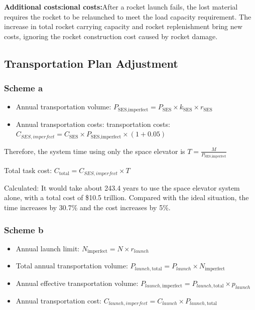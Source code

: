 \textbf{Additional costs:ional costs:}After a rocket launch fails, the lost material requires the rocket to be relaunched to meet the load capacity requirement. The increase in total rocket carrying capacity and rocket replenishment bring new costs, ignoring the rocket construction cost caused by rocket damage.


\subsection{Transportation Plan Adjustment}

\subsubsection{Scheme a}
\begin{itemize}
  \item Annual transportation volume: $P_{\text{SES},\text{imperfect}} = P_{\text{SES}} \times k_{\text{SES}} \times r_{\text{SES}}$

  \item Annual transportation costs: transportation costs: $C_{SES,imperfect} = C_{\text{SES}} \times P_{\text{SES},\text{imperfect}} \times (1 + 0.05)$
\end{itemize}
Therefore, the system time using only the space elevator is \(T = \frac{M}{P_{\text{SES},\text{imperfect}}}\)

Total task cost: \(C_{\text{total}} = C_{SES,imperfect} \times T\)

Calculated: It would take about 243.4 years to use the space elevator system alone, with a total cost of \$10.5 trillion. Compared with the ideal situation, the time increases by 30.7\% and the cost increases by 5\%.


\subsubsection{Scheme b}
\begin{itemize}
  \item Annual launch limit: $N_{\text{imperfect}} = N \times r_{launch}$

  \item Total annual transportation volume: $P_{launch,\text{total}} = P_{launch} \times N_{\text{imperfect}}$

  \item Annual effective transportation volume: $P_{launch,\text{imperfect}} = P_{launch,\text{total}} \times p_{launch}$

  \item Annual transportation cost: $C_{launch,imperfect} = C_{launch} \times P_{launch,\text{total}}$
\end{itemize}

